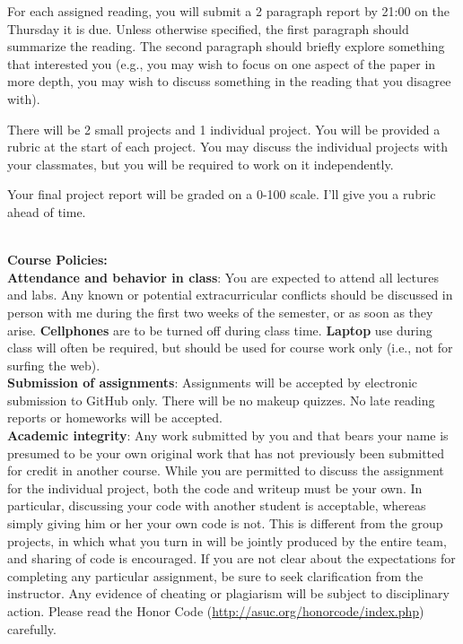 \documentclass[11pt]{article}
\begin{document}
For each assigned reading, you will submit a 2 paragraph report by 21:00 on the
Thursday it is due.  Unless otherwise specified, the first paragraph should
summarize the reading.  The second paragraph should briefly explore something
that interested you (e.g., you may wish to focus on one aspect of the paper in
more depth, you may wish to discuss something in the reading that you disagree
with).

There will be 2 small projects and 1 individual project. You will be provided a
rubric at the start of each project.  You may discuss the individual projects
with your classmates, but you will be required to work on it independently.

Your final project report will be graded on a 0-100 scale. I'll give you a
rubric ahead of time.


\textbf{\large \\ Course Policies:} \\

\textbf{Attendance and behavior in class}: You are expected to attend all lectures
and labs.  Any known or potential extracurricular conflicts should be discussed
in person with me during the first two weeks of the semester, or as
soon as they arise. \textbf{Cellphones} are to be turned off during class time.
\textbf{Laptop} use during class will often be required, but should be
used for course work only (i.e., not for surfing the web).\\

\textbf{Submission of assignments}: Assignments will be accepted by electronic
submission to GitHub only.  There will be no makeup quizzes. No
late reading reports or homeworks will be accepted. \\ %

\textbf{Academic integrity}:
Any work submitted by you and that bears your name is presumed to be your own
original work that has not previously been submitted for credit in another
course. While you are permitted to discuss the assignment for the individual project,
both the code and writeup must be your own.  In particular, discussing your
code with another student is acceptable, whereas simply giving him or her your
own code is not.  This is different from the group projects, in which what you
turn in will be jointly produced by the entire team, and sharing of code is
encouraged. If you are not clear about the expectations for completing any
particular assignment, be sure to seek clarification from the instructor.  Any
evidence of cheating or plagiarism will be subject to disciplinary action.
Please read the Honor Code (\url{http://asuc.org/honorcode/index.php})
carefully.\\
\end{document}
